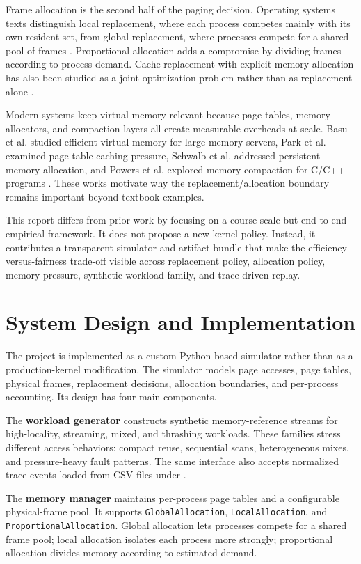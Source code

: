 \documentclass[conference]{IEEEtran}
\newcommand{\file}[1]{\path{#1}}
\begin{document}
Frame allocation is the second half of the paging decision. Operating systems texts distinguish local replacement, where each process competes mainly with its own resident set, from global replacement, where processes compete for a shared pool of frames \cite{Silberschatz2019}. Proportional allocation adds a compromise by dividing frames according to process demand. Cache replacement with explicit memory allocation has also been studied as a joint optimization problem rather than as replacement alone \cite{Ghandeharizadeh2015}.

Modern systems keep virtual memory relevant because page tables, memory allocators, and compaction layers all create measurable overheads at scale. Basu et al. studied efficient virtual memory for large-memory servers, Park et al. examined page-table caching pressure, Schwalb et al. addressed persistent-memory allocation, and Powers et al. explored memory compaction for C/C++ programs \cite{Basu2013,Park2020,Schwalb2015,Powers2019}. These works motivate why the replacement/allocation boundary remains important beyond textbook examples.

This report differs from prior work by focusing on a course-scale but end-to-end empirical framework. It does not propose a new kernel policy. Instead, it contributes a transparent simulator and artifact bundle that make the efficiency-versus-fairness trade-off visible across replacement policy, allocation policy, memory pressure, synthetic workload family, and trace-driven replay.

\section{System Design and Implementation}
The project is implemented as a custom Python-based simulator rather than as a production-kernel modification. The simulator models page accesses, page tables, physical frames, replacement decisions, allocation boundaries, and per-process accounting. Its design has four main components.

The \textbf{workload generator} constructs synthetic memory-reference streams for high-locality, streaming, mixed, and thrashing workloads. These families stress different access behaviors: compact reuse, sequential scans, heterogeneous mixes, and pressure-heavy fault patterns. The same interface also accepts normalized trace events loaded from CSV files under \file{workloads/traces/}.

The \textbf{memory manager} maintains per-process page tables and a configurable physical-frame pool. It supports \texttt{GlobalAllocation}, \texttt{LocalAllocation}, and \texttt{ProportionalAllocation}. Global allocation lets processes compete for a shared frame pool; local allocation isolates each process more strongly; proportional allocation divides memory according to estimated demand.
\end{document}
